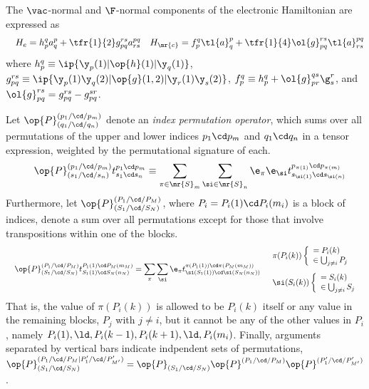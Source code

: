 \documentclass[11pt,fleqn]{article}
\numberwithin{equation}{section}
\begin{document}
\begin{ex}

The $\vac$-normal and $\F$-normal components of the electronic Hamiltonian are expressed as
\begin{align}
&&
  H_e
=
  h_p^q
  a^p_q
+
  \tfr{1}{2}
  g_{pq}^{rs}
  a^{pq}_{rs}
&&
  H_\mr{c}
=
  f_p^q
  \tl{a}^p_q
+
  \tfr{1}{4}
  \ol{g}_{pq}^{rs}
  \tl{a}^{pq}_{rs}
\end{align}
where $h_p^q\equiv\ip{\y_p(1)|\op{h}(1)|\y_q(1)}$, $g_{pq}^{rs}\equiv\ip{\y_p(1)\y_q(2)|\op{g}(1,2)|\y_r(1)\y_s(2)}$, $f_p^q\equiv h_p^q+\ol{g}_{pr}^{qs}\g^r_s$, and $\ol{g}_{pq}^{rs}=g_{pq}^{rs}-g_{pq}^{sr}$.
\end{ex}


\begin{dfn}
Let $\op{P}^{(p_1/\cd/p_m)}_{(q_1/\cd/q_n)}$ denote an \textit{index permutation operator}, which sums over all permutations of the upper and lower indices $p_1\cd p_m$ and $q_1\cd q_n$ in a tensor expression, weighted by the permutational signature of each.
\begin{align}
&&
  \op{P}^{(p_1/\cd/p_m)}_{(s_1/\cd/s_n)}
  t^{p_1\cd p_m}_{s_1\cd s_n}
\equiv
  \sum_{\pi\in\mr{S}_m}
  \sum_{\si\in\mr{S}_n}
  \e_\pi\e_\si
  t^{p_{\pi(1)}\cd p_{\pi(m)}}_{s_{\si(1)}\cd s_{\si(n)}}
\end{align}
Furthermore, let $\op{P}^{(P_1/\cd/P_M)}_{(S_1/\cd/S_N)}$, where $P_i=P_i(1)\cd P_i(m_i)$ is a block of indices, denote a sum over all permutations except for those that involve transpositions within one of the blocks.
\begin{align}
&&
  \op{P}^{(P_1/\cd/P_M)}_{(S_1/\cd/S_N)}
  t^{P_1(1)\cd P_M(m_M)}_{S_1(1)\cd S_N(n_N)}
=
  \sum_\pi
  \sum_\si
  \e_\pi
  t^{\pi(P_1(1))\cd\pi(P_M(m_M))}_{\si(S_1(1))\cd\si(S_N(n_N))}
&&
  \begin{array}{l}
    \pi(P_i(k))
    \left\{\begin{array}{l}
      = P_i(k) \\
      \in \bigcup_{j\neq i} P_j
    \end{array}\right.
  \\[15pt]
    \si(S_i(k))
    \left\{\begin{array}{l}
      = S_i(k) \\
      \in \bigcup_{j\neq i} S_j
    \end{array}\right.
  \end{array}
\end{align}
That is, the value of $\pi(P_i(k))$ is allowed to be $P_i(k)$ itself or any value in the remaining blocks, $P_j$ with $j\neq i$, but it cannot be any of the other values in $P_i$, namely $P_i(1),\ld, P_i(k-1), P_i(k+1),\ld, P_i(m_i)$.
Finally, arguments separated by vertical bars indicate indpendent sets of permutations, 
$
  \op{P}^{(P_1/\cd/P_M|P'_1/\cd/P'_{M'})}_{(S_1/\cd/S_N)}
=
  \op{P}_{(S_1/\cd/S_N)}
  \op{P}^{(P_1/\cd/P_M)}
  \op{P}^{(P'_1/\cd/P'_{M'})}
$.
\end{dfn}
\end{document}
